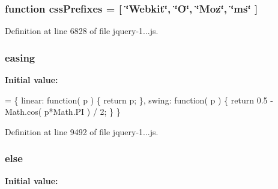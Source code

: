 \subsubsection[{\texorpdfstring{css\+Prefixes}{cssPrefixes}}]{\setlength{\rightskip}{0pt plus 5cm}function css\+Prefixes = \mbox{[} \char`\"{}Webkit\char`\"{}, \char`\"{}O\char`\"{}, \char`\"{}Moz\char`\"{}, \char`\"{}ms\char`\"{} \mbox{]}}\hypertarget{_scripts_2jquery-1_810_82_8js_a2ed3892172b336458b8074254f4471da}{}\label{_scripts_2jquery-1_810_82_8js_a2ed3892172b336458b8074254f4471da}


Definition at line 6828 of file jquery-\/1...\+js.

\subsubsection[{\texorpdfstring{easing}{easing}}]{ easing}\hypertarget{_scripts_2jquery-1_810_82_8js_a9758a312629fa6de1744280dd6e6253b}{}\label{_scripts_2jquery-1_810_82_8js_a9758a312629fa6de1744280dd6e6253b}
{\bfseries Initial value\+:}
\begin{DoxyCode}
= \{
    linear: \textcolor{keyword}{function}( p ) \{
        \textcolor{keywordflow}{return} p;
    \},
    swing: \textcolor{keyword}{function}( p ) \{
        \textcolor{keywordflow}{return} 0.5 - Math.cos( p*Math.PI ) / 2;
    \}
\}
\end{DoxyCode}


Definition at line 9492 of file jquery-\/1...\+js.

\subsubsection[{\texorpdfstring{else}{else}}]{\setlength{\rightskip}{0pt plus 5cm}else}\hypertarget{_scripts_2jquery-1_810_82_8js_a0544c3fe466e421738dae463968b70ba}{}\label{_scripts_2jquery-1_810_82_8js_a0544c3fe466e421738dae463968b70ba}
{\bfseries Initial value\+:}


